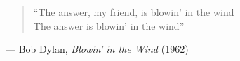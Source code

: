\chapter*{}

\vfill

\begin{center}
    \begin{verse}
        ``The answer, my friend, is blowin' in the wind \\
        The answer is blowin' in the wind''
    \end{verse}
\end{center}

\vfill

\begin{center}
    --- Bob Dylan, \textit{Blowin’ in the Wind} (1962) 
\end{center}

\vfill 
